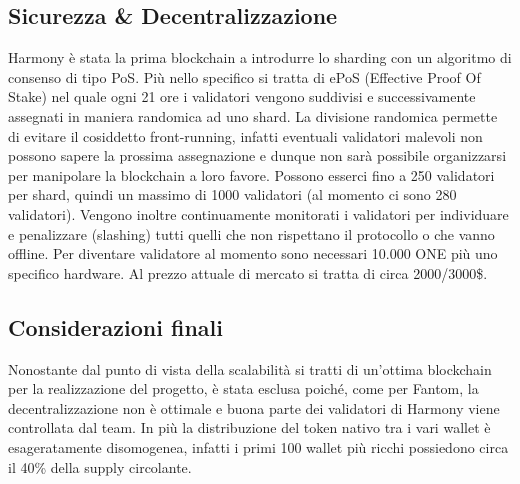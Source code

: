 \documentclass[a4paper, 12pt]{article}
\begin{document}
\subsection*{Sicurezza \& Decentralizzazione}
Harmony è stata la prima blockchain a introdurre lo sharding con un algoritmo di consenso di tipo PoS. Più nello specifico si tratta di ePoS (Effective Proof Of Stake) nel quale ogni 21 ore i validatori vengono suddivisi e successivamente assegnati in maniera randomica ad uno shard. La divisione randomica permette di evitare il cosiddetto front-running, infatti eventuali validatori malevoli non possono sapere la prossima assegnazione e dunque non sarà possibile organizzarsi per manipolare la blockchain a loro favore.
Possono esserci fino a 250 validatori per shard, quindi un massimo di 1000 validatori (al momento ci sono 280 validatori).
Vengono inoltre continuamente monitorati i validatori per individuare e penalizzare (slashing) tutti quelli che non rispettano il protocollo o che vanno offline.
Per diventare validatore al momento sono necessari 10.000 ONE più uno specifico hardware. Al prezzo attuale di mercato si tratta di circa 2000/3000\$.
\subsection*{Considerazioni finali}
Nonostante dal punto di vista della scalabilità si tratti di un'ottima blockchain per la realizzazione del progetto, è stata esclusa poiché, come per Fantom, la decentralizzazione non è ottimale e buona parte dei validatori di Harmony viene controllata dal team. In più la distribuzione del token nativo tra i vari wallet è esageratamente disomogenea, infatti i primi 100 wallet più ricchi possiedono circa il 40\% della supply circolante.

\newpage
\end{document}
